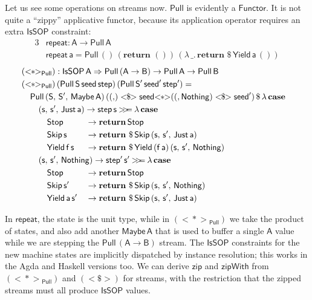 \documentclass[acmsmall,screen,review,anonymous]{acmart}
\newcommand{\mit}[1]{{\mathsf{#1}}}
\newcommand{\msf}[1]{{\mathsf{#1}}}
\newcommand{\mbf}[1]{{\mathbf{#1}}}
\newcommand{\ind}{\hspace{1em}}
\newcommand{\return}{\mbf{return}\,}
\newcommand{\lam}{\lambda\,}
\newcommand{\vA}{\mathsf{A}}
\newcommand{\vB}{\mathsf{B}}
\newcommand{\vS}{\mathsf{S}}
\newcommand{\va}{\mathsf{a}}
\newcommand{\vf}{\mathsf{f}}
\newcommand{\vs}{\mathsf{s}}
\newcommand{\IsSOP}{\msf{IsSOP}}
\newcommand{\appull}{\ap_{\Pull}}
\newcommand{\Functor}{\msf{Functor}}
\newcommand{\case}{\mbf{case\,}}
\newcommand{\bind}{\mathbin{>\!\!>\mkern-6.7mu=}}
\newcommand{\Maybe}{\msf{Maybe}}
\newcommand{\Nothing}{\msf{Nothing}}
\newcommand{\Just}{\msf{Just}}
\theoremstyle{remark}
\newcommand{\fmap}{<\!\!\$\!\!>}
\newcommand{\ap}{{<\!\!*\!\!>}}
\newcommand{\RA}{\Rightarrow}
\newcommand{\Stop}{\msf{Stop}}
\newcommand{\Skip}{\msf{Skip}}
\newcommand{\Yield}{\msf{Yield}}
\newcommand{\dlr}{\,\$\,}
\newcommand{\seed}{\mit{seed}}
\newcommand{\step}{\mit{step}}
\newcommand{\Pull}{\msf{Pull}}
\begin{document}
Let us see some operations on streams now. $\Pull$ is evidently a $\Functor$. It
is not quite a ``zippy'' applicative functor, because its application operator
requires an extra $\IsSOP$ constraint:
\begin{alignat*}{3}
  &\mit{repeat} : \vA \to \Pull\,\vA\\
  &\mit{repeat}\,\va = \Pull\,()\,(\return\,())\,(\lam \_.\,\return \dlr \Yield\,\va\,())
\end{alignat*}
\begin{alignat*}{3}
  &\hspace{-7em}\mathrlap{({\ap_{\Pull}}) : \IsSOP\,\vA \RA \Pull\,(\vA \to \vB) \to \Pull\,\vA \to \Pull\,\vB }\\
  &\hspace{-7em}\mathrlap{({\ap_{\Pull}})\,(\Pull\,\vS\,\seed\,\step)\,(\Pull\,\vS'\,\seed'\,\step') =}\\
  &\hspace{-7em}\mathrlap{ \ind \Pull\,(\vS,\,\vS',\,\Maybe\,\vA)\,(({,}) \fmap \seed \ap ((,\Nothing) \fmap \seed') \dlr \lam \case }\\
  &\hspace{-7em}\mathrlap{ \ind \ind (\vs,\,\vs',\,\Just\,\va) \to \step\,\vs \bind \lam \case}\\
  &\hspace{-7em} \ind \ind \ind \Stop        &&\to \return \Stop \\
  &\hspace{-7em} \ind \ind \ind \Skip\,\vs     &&\to \return \dlr \Skip\,(\vs,\,\vs',\,\Just\,\va) \\
  &\hspace{-7em} \ind \ind \ind \Yield\,\vf\,\vs &&\to \return \dlr \Yield\,(\vf\,\va)\,(\vs,\,\vs',\,\Nothing) \\
  &\hspace{-7em} \mathrlap{\ind \ind (\vs,\,\vs',\,\Nothing) \to \step'\,\vs' \bind \lam \case }\\
  &\hspace{-7em} \ind \ind \ind \Stop         &&\to \return \Stop \\
  &\hspace{-7em} \ind \ind \ind \Skip\,\vs'     &&\to \return \dlr \Skip\,(\vs,\,\vs',\,\Nothing) \\
  &\hspace{-7em} \ind \ind \ind \Yield\,\va\,\vs' &&\to \return \dlr \Skip\,(\vs,\,\vs',\,\Just\,\va)
\end{alignat*}

In $\mit{repeat}$, the state is the unit type, while in $({\appull})$ we take
the product of states, and also add another $\Maybe\,\vA$ that is used to buffer
a single $\vA$ value while we are stepping the $\Pull\,(\vA \to \vB)$ stream.
The $\IsSOP$ constraints for the new machine states are implicitly dispatched
by instance resolution; this works in the Agda and Haskell versions too. We can
derive $\mit{zip}$ and $\mit{zipWith}$ from $({\appull})$ and $({\fmap})$ for
streams, with the restriction that the zipped streams must all produce $\IsSOP$
values.
\end{document}
